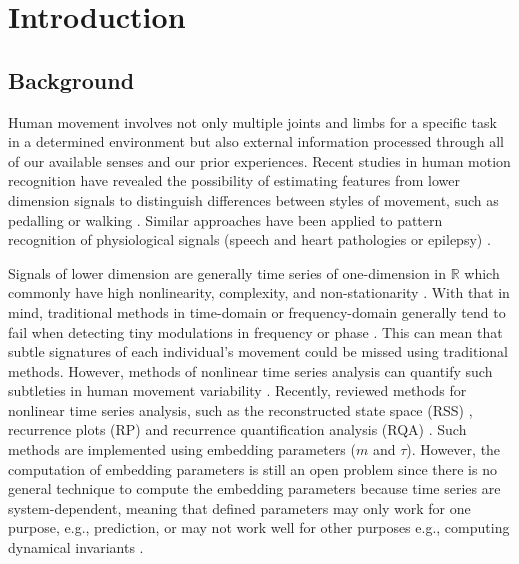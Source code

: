 
\chapter{Introduction} \label{chapter1}


\graphicspath{{figs/chapter1/PDF/}}



\section{Background}
Human movement involves not only multiple
joints and limbs for a specific task in a determined environment
but also external information processed through all of our available 
senses and our prior experiences. 
Recent studies in human motion recognition have revealed the possibility 
of estimating features from lower dimension signals to distinguish 
differences between styles of movement, such as pedalling 
\citep{Quintana-Duque2012, Quintana-Duque2016} or walking 
\citep{sama2013, frank2010}. 
Similar approaches have been applied to pattern recognition of 
physiological signals (speech and heart pathologies or epilepsy) 
\citep{gomezgarcia2014}.

Signals of lower dimension are generally time series 
of one-dimension in $\mathbb{R}$ which commonly have high nonlinearity, 
complexity, and non-stationarity 
\citep{gomezgarcia2014, huffaker2017, caballero2014}.
With that in mind, traditional methods in time-domain or 
frequency-domain generally tend to fail when detecting 
tiny modulations in frequency or phase \citep{marwan2011}. 
This can mean that subtle signatures of each 
individual's movement could be missed using traditional methods. 
However, methods of nonlinear time series analysis 
can quantify such subtleties in human movement variability 
\citep{Quintana-Duque2012, Quintana-Duque2016, sama2013, 
frank2010, gomezgarcia2014, marwan2011, stergiou2011, packard1980}.
Recently, \cite{bradley2015} reviewed methods for
nonlinear time series analysis, such as the reconstructed state space 
(RSS) \citep{takens1981}, recurrence plots (RP) \citep{eckmann1987} and
recurrence quantification analysis (RQA) \citep{zbilut1992}.
Such methods are implemented using embedding parameters ($m$ and $\tau$).
However, the computation of embedding parameters is still an open problem
since there is no general technique to compute the embedding parameters 
because time series are system-dependent, meaning that defined parameters
may only work for one purpose, e.g., prediction, or may not work well 
for other purposes e.g., computing dynamical invariants \citep{bradley2015}.

